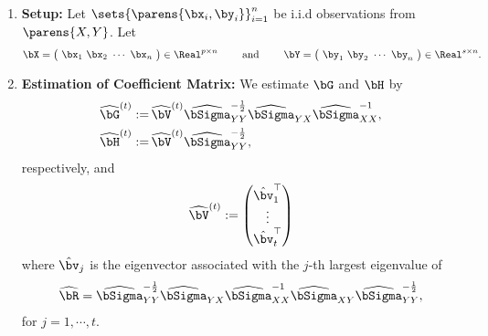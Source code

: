 \documentclass[12pt]{article}
\begin{document}
\begin{enumerate}[label=\textbf{\arabic*.}]

	\item \textbf{Setup:} Let $\sets{\parens{\bx_i, \by_i}}_{i=1}^n$ be i.i.d observations from $\parens{X, Y}$. Let 
	\begin{align*}
		\bX = \begin{pmatrix}
			\ \bx_1 \ \bx_2 \ \cdots \ \bx_n \ 
		\end{pmatrix} \in \Real^{p \times n} \qquad \text{ and } \qquad
		\bY = \begin{pmatrix}
			\ \by_1 \ \by_2 \ \cdots \ \by_n \ 
		\end{pmatrix} \in \Real^{s \times n}. 
	\end{align*}
	
	\item \textbf{Estimation of Coefficient Matrix:} We estimate $\bG$ and $\bH$ by 
	\begin{align}
		\widehat{\bG}^{(t)} := & \, \widehat{\bV}^{(t)} \widehat{\bSigma}_{YY}^{-\frac{1}{2}} \widehat{\bSigma}_{YX} \widehat{\bSigma}_{XX}^{-1}, \\ 
		\widehat{\bH}^{(t)} := & \, \widehat{\bV}^{(t)} \widehat{\bSigma}_{YY}^{-\frac{1}{2}}, 
	\end{align}
	respectively, and 
	\begin{align}
		\widehat{\bV}^{(t)} := \begin{pmatrix}
			\hat{\bv}_1^\top \\ \vdots \\ \hat{\bv}_t^\top
		\end{pmatrix} 
	\end{align}
	where $\hat{\bv}_j$ is the eigenvector associated with the $j$-th largest eigenvalue of 
	\begin{align}
		\widehat{\bR} = \widehat{\bSigma}_{YY}^{-\frac{1}{2}} \widehat{\bSigma}_{YX} \widehat{\bSigma}_{XX}^{-1} \widehat{\bSigma}_{XY} \widehat{\bSigma}_{YY}^{-\frac{1}{2}}, 
	\end{align}
	for $j = 1, \cdots, t$. 
	

\end{enumerate}
\end{document}
